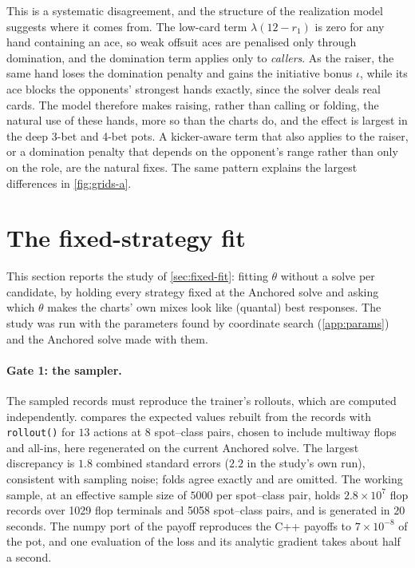 This is a systematic disagreement, and the structure of the realization model suggests where it comes from. The low-card term $\lambda(12-r_1)$ is zero for any hand containing an ace, so weak offsuit aces are penalised only through domination, and the domination term applies only to \emph{callers}. As the raiser, the same hand loses the domination penalty and gains the initiative bonus $\iota$, while its ace blocks the opponents' strongest hands exactly, since the solver deals real cards. The model therefore makes raising, rather than calling or folding, the natural use of these hands, more so than the charts do, and the effect is largest in the deep 3-bet and 4-bet pots. A kicker-aware term that also applies to the raiser, or a domination penalty that depends on the opponent's range rather than only on the role, are the natural fixes. The same pattern explains the largest differences in \cref{fig:grids-a}.

\section{The fixed-strategy fit}\label{sec:res-fit}

This section reports the study of \cref{sec:fixed-fit}: fitting $\theta$ without a solve per candidate, by holding every strategy fixed at the Anchored solve and asking which $\theta$ makes the charts' own mixes look like (quantal) best responses. The study was run with the parameters found by coordinate search (\cref{app:params}) and the Anchored solve made with them.

\paragraph{Gate 1: the sampler.} The sampled records must reproduce the trainer's rollouts, which are computed independently.  compares the expected values rebuilt from the records with \texttt{rollout()} for $13$ actions at $8$ spot--class pairs, chosen to include multiway flops and all-ins, here regenerated on the current Anchored solve. The largest discrepancy is $1.8$ combined standard errors ($2.2$ in the study's own run), consistent with sampling noise; folds agree exactly and are omitted. The working sample, at an effective sample size of $5000$ per spot--class pair, holds $2.8\times 10^7$ flop records over \num{1029} flop terminals and \num{5058} spot--class pairs, and is generated in $20$ seconds. The numpy port of the payoff reproduces the C++ payoffs to $7\times 10^{-8}$ of the pot, and one evaluation of the loss and its analytic gradient takes about half a second.


